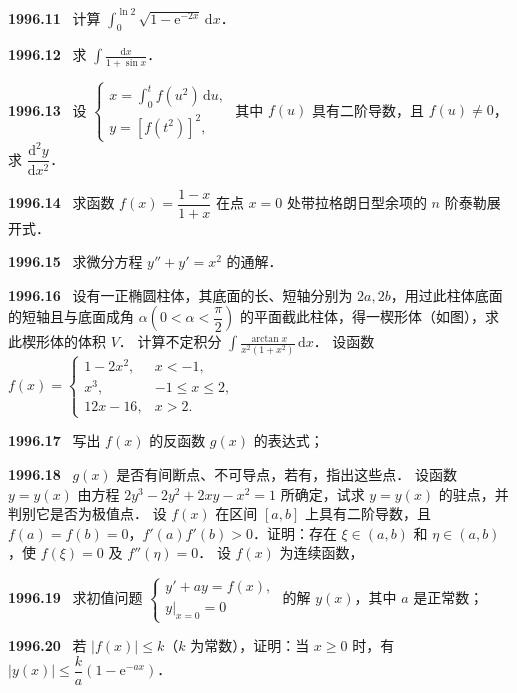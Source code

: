 \documentclass[UTF8,12pt]{ctexart}
\newcommand{\qn}[1]{\textbf{\large #1}\ }
\begin{document}
\vfill
\newpage
\qn{1996.11}
计算 $\displaystyle\int_0^{\ln 2}\sqrt{1-\mathrm{e}^{-2x}}\,\mathrm{d}x$．

\vfill
\newpage
\qn{1996.12}
求 $\displaystyle\int\frac{\mathrm{d}x}{1+\sin x}$．

\vfill
\newpage
\qn{1996.13}
设 $\begin{cases} x=\displaystyle\int_0^t f(u^2)\,\mathrm{d}u,\\ y=[f(t^2)]^2, \end{cases}$ 其中 $f(u)$ 具有二阶导数，且 $f(u)\neq 0$，求 $\dfrac{\mathrm{d}^2y}{\mathrm{d}x^2}$．

\vfill
\newpage
\qn{1996.14}
求函数 $f(x)=\dfrac{1-x}{1+x}$ 在点 $x=0$ 处带拉格朗日型余项的 $n$ 阶泰勒展开式．

\vfill
\newpage
\qn{1996.15}
求微分方程 $y''+y'=x^2$ 的通解．

\vfill
\newpage
\qn{1996.16}
设有一正椭圆柱体，其底面的长、短轴分别为 $2a,2b$，用过此柱体底面的短轴且与底面成角 $\alpha\left(0<\alpha<\dfrac{\pi}{2}\right)$ 的平面截此柱体，得一楔形体（如图），求此楔形体的体积 $V$．
计算不定积分 $\displaystyle\int\frac{\arctan x}{x^2(1+x^2)}\,\mathrm{d}x$．
设函数 $f(x)=\begin{cases} 1-2x^2, & x<-1,\\ x^3, & -1\leqslant x\leqslant 2,\\ 12x-16, & x>2. \end{cases}$

\vfill
\newpage
\qn{1996.17}
写出 $f(x)$ 的反函数 $g(x)$ 的表达式；

\vfill
\newpage
\qn{1996.18}
$g(x)$ 是否有间断点、不可导点，若有，指出这些点．
设函数 $y=y(x)$ 由方程 $2y^3-2y^2+2xy-x^2=1$ 所确定，试求 $y=y(x)$ 的驻点，并判别它是否为极值点．
设 $f(x)$ 在区间 $[a,b]$ 上具有二阶导数，且 $f(a)=f(b)=0$，$f'(a)f'(b)>0$．证明：存在 $\xi\in(a,b)$ 和 $\eta\in(a,b)$，使 $f(\xi)=0$ 及 $f''(\eta)=0$．
设 $f(x)$ 为连续函数，

\vfill
\newpage
\qn{1996.19}
求初值问题 $\begin{cases} y'+ay=f(x),\\ \left.y\right|_{x=0}=0 \end{cases}$ 的解 $y(x)$，其中 $a$ 是正常数；

\vfill
\newpage
\qn{1996.20}
若 $|f(x)|\leqslant k$（$k$ 为常数），证明：当 $x\geqslant 0$ 时，有 $|y(x)|\leqslant\dfrac{k}{a}(1-\mathrm{e}^{-ax})$．

\vfill
\newpage
\end{document}
